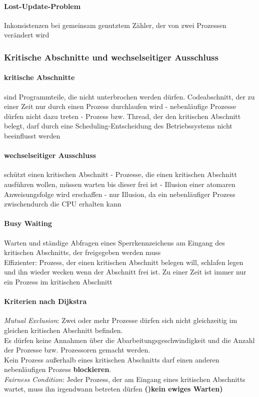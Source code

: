 \documentclass[10pt,a4paper,landscape]{article}
\begin{document}
\begin{multicols*}{3}
	\paragraph{Lost-Update-Problem} Inkonsistenzen bei gemeinsam genutztem Zähler, der von zwei Prozessen verändert wird
	\subsubsection{Kritische Abschnitte und wechselseitiger Ausschluss}
	\paragraph{kritische Abschnitte} sind Programmteile, die nicht unterbrochen werden dürfen. Codeabschnitt, der zu einer Zeit nur durch einen Prozess durchlaufen wird - nebenläufige Prozesse dürfen nicht dazu treten - Prozess bzw. Thread, der den kritischen Abschnitt belegt, darf durch eine Scheduling-Entscheidung des Betriebssystems nicht beeinflusst werden
	\paragraph{wechselseitiger Ausschluss} schützt einen kritischen Abschnitt - Prozesse, die einen kritischen Abschnitt ausführen wollen, müssen warten bis dieser frei ist - Illusion einer atomaren Anweisungsfolge wird erschaffen - nur Illusion, da ein nebenläufiger Prozess zwischendurch die CPU erhalten kann
	\paragraph{Busy Waiting} Warten und ständige Abfragen eines Sperrkennzeichens am Eingang des kritischen Abschnitts, der freigegeben werden muss\\
	Effizienter: Prozess, der einen kritischen Abschnitt belegen will, schlafen legen und ihn wieder wecken wenn der Abschnitt frei ist. Zu einer Zeit ist immer nur ein Prozess im kritischen Abschnitt
	\paragraph{Kriterien nach Dijkstra} \textit{Mutual Exclusion}: Zwei oder mehr Prozesse dürfen sich nicht gleichzeitig im gleichen kritischen Abschnitt befinden.\\ Es dürfen keine Annahmen über die Abarbeitungsgeschwindigkeit und die Anzahl der Prozesse bzw. Prozessoren gemacht werden.\\ Kein Prozess außerhalb eines kritischen Abschnitts darf einen anderen nebenläufigen Prozess
	\textbf{blockieren}. \\\textit{Fairness Condition}: Jeder Prozess, der am Eingang eines kritischen Abschnitts wartet, muss ihn irgendwann betreten dürfen \textbf{()kein ewiges Warten)}

\end{multicols*}
\end{document}
